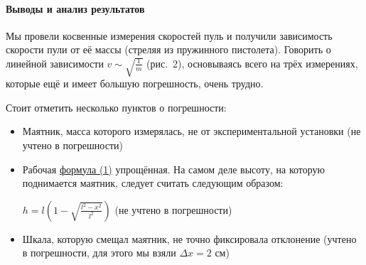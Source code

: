 \documentclass{article}
\begin{document}
\paragraph{Выводы и анализ результатов}
Мы провели косвенные измерения скоростей пуль и получили зависимость скорости пули от её массы (стреляя из пружинного пистолета). Говорить о линейной зависимости $v\sim\sqrt{\frac{1}{m}}$ (рис.~2), основываясь всего на трёх измерениях, которые ещё и имеет большую погрешность, очень трудно. 

Стоит отметить несколько пунктов о погрешности: 
\begin{itemize}
	\item Маятник, масса которого измерялась, не от экспериментальной установки (не учтено в погрешности)
	\item Рабочая \hyperlink{formuls}{формула (1)} упрощённая. На самом деле высоту, на которую поднимается маятник, следует считать следующим образом:
	
	 $h=l\left(1-\sqrt{\frac{l^2-x^2}{l^2}} \right) $ (не учтено в погрешности)
	 \item Шкала, которую смещал маятник, не точно фиксировала отклонение (учтено в погрешности, для этого мы взяли $ \Delta x = 2 $ см)
\end{itemize}
\end{document}
